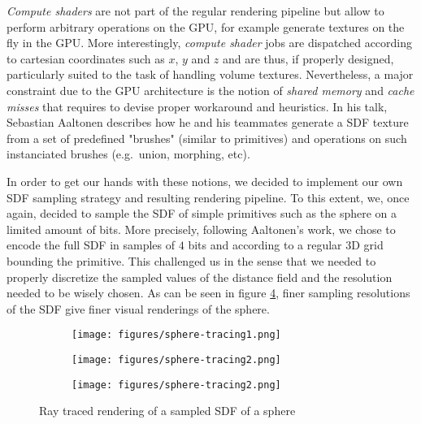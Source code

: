 \documentclass[10pt,a4paper,english, twocolumn]{article}
\begin{document}
\textit{Compute shaders} are not part of the regular rendering pipeline but allow to perform arbitrary operations on the GPU, for example generate textures on the fly in the GPU. More interestingly, \textit{compute shader} jobs are dispatched according to cartesian coordinates such as $x$, $y$ and $z$ and are thus, if properly designed, particularly suited to the task of handling volume textures. Nevertheless, a major constraint due to the GPU architecture is the notion of \textit{shared memory} and \textit{cache misses} that requires to devise proper workaround and heuristics. In his talk, Sebastian Aaltonen describes how he and his teammates generate a SDF texture from a set of predefined "brushes" (similar to primitives) and operations on such instanciated brushes (e.g.\ union, morphing, etc).

In order to get our hands with these notions, we decided to implement our own SDF sampling strategy and resulting rendering pipeline. To this extent, we, once again, decided to sample the SDF of simple primitives such as the sphere on a limited amount of bits. More precisely, following Aaltonen's work, we chose to encode the full SDF in samples of $4$ bits and according to a regular 3D grid bounding the primitive. This challenged us in the sense that we needed to properly discretize the sampled values of the distance field and the resolution needed to be wisely chosen. As can be seen in figure \ref{fig:sampled-sphere}, finer sampling resolutions of the SDF give finer visual renderings of the sphere.

\begin{figure}
    \begin{subfigure}{.33\linewidth}
        \centering
        \texttt{[image: figures/sphere-tracing1.png]}
        \caption{}
        \label{sfig:sampled-sphere1}
    \end{subfigure}%
    \begin{subfigure}{.33\linewidth}
        \centering
        \texttt{[image: figures/sphere-tracing2.png]}
        \caption{}
        \label{sfig:sampled-sphere2}
    \end{subfigure}
    \begin{subfigure}{.33\linewidth}
        \centering
        \texttt{[image: figures/sphere-tracing2.png]}
        \caption{}
        \label{sfig:sampled-sphere3}
    \end{subfigure}
    \caption{Ray traced rendering of a sampled SDF of a sphere}
    \label{fig:sampled-sphere}
\end{figure}
\end{document}

